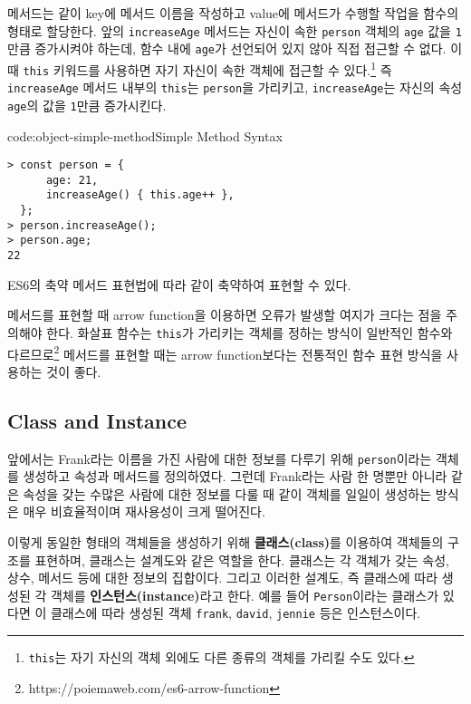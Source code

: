 메서드는 \와 같이 key에 메서드 이름을 작성하고 value에 메서드가 수행할 작업을 함수의 형태로 할당한다. 앞의 \texttt{increaseAge} 메서드는 자신이 속한 \texttt{person} 객체의 \texttt{age} 값을 \texttt{1}만큼 증가시켜야 하는데, 함수 내에 \texttt{age}가 선언되어 있지 않아 직접 접근할 수 없다. 이때 \texttt{this} 키워드를 사용하면 자기 자신이 속한 객체에 접근할 수 있다.\footnote{\texttt{this}는 자기 자신의 객체 외에도 다른 종류의 객체를 가리킬 수도 있다.} 즉 \texttt{increaseAge} 메서드 내부의 \texttt{this}는 \texttt{person}을 가리키고, \texttt{increaseAge}는 자신의 속성 \texttt{age}의 값을 \texttt{1}만큼 증가시킨다.

\begin{codeenv}{code:object-simple-method}{Simple Method Syntax}\begin{verbatim}
> const person = {
      age: 21,
      increaseAge() { this.age++ },
  };
> person.increaseAge();
> person.age;
22
\end{verbatim}
\end{codeenv}

ES6의 축약 메서드 표현법에 따라 \와 같이 축약하여 표현할 수 있다.

메서드를 표현할 때 arrow function을 이용하면 오류가 발생할 여지가 크다는 점을 주의해야 한다. 화살표 함수는 \texttt{this}가 가리키는 객체를 정하는 방식이 일반적인 함수와 다르므로\footnote{https://poiemaweb.com/es6-arrow-function} 메서드를 표현할 때는 arrow function보다는 전통적인 함수 표현 방식을 사용하는 것이 좋다.

\subsection*{Class and Instance}

앞에서는 Frank라는 이름을 가진 사람에 대한 정보를 다루기 위해 \texttt{person}이라는 객체를 생성하고 속성과 메서드를 정의하였다. 그런데 Frank라는 사람 한 명뿐만 아니라 같은 속성을 갖는 수많은 사람에 대한 정보를 다룰 때 \와 같이 객체를 일일이 생성하는 방식은 매우 비효율적이며 재사용성이 크게 떨어진다.

이렇게 동일한 형태의 객체들을 생성하기 위해 \textbf{클래스(class)}를 이용하여 객체들의 구조를 표현하며, 클래스는 설계도와 같은 역할을 한다. 클래스는 각 객체가 갖는 속성, 상수, 메서드 등에 대한 정보의 집합이다. 그리고 이러한 설계도, 즉 클래스에 따라 생성된 각 객체를 \textbf{인스턴스(instance)}라고 한다. 예를 들어 \texttt{Person}이라는 클래스가 있다면 이 클래스에 따라 생성된 객체 \texttt{frank}, \texttt{david}, \texttt{jennie} 등은 인스턴스이다.


